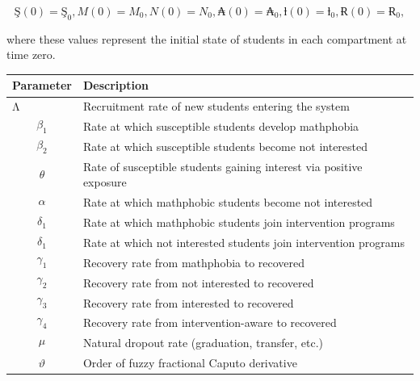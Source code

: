 \documentclass[10pt]{NSP1}
\makeatletter
\newcommand\jltx@wideopen{\par\addvspace{\medskipamount}\noindent}
\newcommand\jltx@wideclose{\par\addvspace{\medskipamount}}
\newenvironment{jltxspan}
  {\if@twocolumn\let\jltx@spannext\strip\else\let\jltx@spannext\jltx@wideopen\fi\jltx@spannext}
  {\if@twocolumn\let\jltx@spanend\endstrip\else\let\jltx@spanend\jltx@wideclose\fi\jltx@spanend}
\newcommand\JLTXaboveplacement{\par\addvspace{6pt plus 2pt minus 2pt}\noindent}
\newcommand\JLTXbelowplacement{\par\addvspace{6pt plus 2pt minus 2pt}}
\makeatother
\begin{document}
\[
Ş(0) = Ş_{0},M(0) = M_{0},N(0) = N_{0},₳(0) = ₳_{0},ƚ(0) = ƚ_{0},Ɍ(0) = Ɍ_{0},
\]

where these values represent the initial state of students in each compartment at time zero.

\par\medskip{}\smallskip

\JLTXaboveplacement \begin{jltxspan}%
\noindent\begin{minipage}{\linewidth}%
\centering
{\small
\begin{tabular}{|>{\centering\arraybackslash}p{}|>{\raggedright\arraybackslash}p{}|}
\hline
\cellcolor[HTML]{F2F2F2}\textbf{Parameter} & \cellcolor[HTML]{F2F2F2}\textbf{Description} \\
\hline
Λ & Recruitment rate of new students entering the system \\
\hline
\[\beta_{1}\] & Rate at which susceptible students develop mathphobia \\
\hline
\[\beta_{2}\] & Rate at which susceptible students become not interested \\
\hline
\[\theta\] & Rate of susceptible students gaining interest via positive exposure \\
\hline
\[\alpha\] & Rate at which mathphobic students become not interested \\
\hline
\[\delta_{1}\] & Rate at which mathphobic students join intervention programs \\
\hline
\[\delta_{1}\] & Rate at which not interested students join intervention programs \\
\hline
\[\gamma_{1}\] & Recovery rate from mathphobia to recovered \\
\hline
\[\gamma_{2}\] & Recovery rate from not interested to recovered \\
\hline
\[\gamma_{3}\] & Recovery rate from interested to recovered \\
\hline
\[\gamma_{4}\] & Recovery rate from intervention-aware to recovered \\
\hline
\[\mu\] & Natural dropout rate (graduation, transfer, etc.) \\
\hline
\[\vartheta\] & Order of fuzzy fractional Caputo derivative \\
\hline
\end{tabular}}
%
\end{minipage}%
\end{jltxspan}\JLTXbelowplacement 
\end{document}
